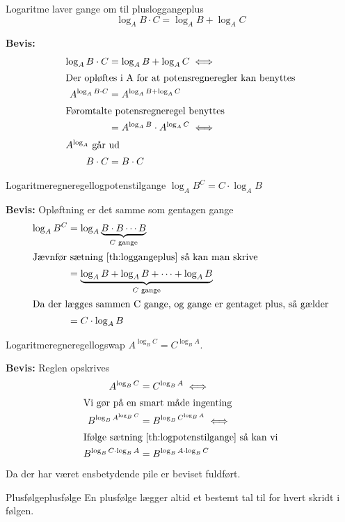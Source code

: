 \documentclass{article}
\begin{document}
\begin{theorem}{Logaritme laver gange om til plus}{loggangeplus}
	\[\log_A{B \cdot C} = \log_AB + \log_AC\]
\end{theorem}
\textbf{Bevis:}
\begin{align*}
	\log_A{B \cdot C} &= \log_AB + \log_AC \iff\\
\intertext{Der opløftes i A for at potensregneregler kan benyttes}
	A^{\log_A{B \cdot C}} &= A^{\log_AB + \log_AC}\\
\intertext{Føromtalte potensregneregel benyttes}
						  &= A^{\log_AB} \cdot A^{\log_AC} \iff\\
\intertext{$A^{\log_A}$ går ud}
	B \cdot C &= B \cdot C
\end{align*}

\begin{theorem}{Logaritmeregneregel}{logpotenstilgange}
	$\log_AB^C = C \cdot \log_AB$
\end{theorem}
\textbf{Bevis:}
Opløftning er det samme som gentagen gange
\begin{align*}
	\log_AB^C &= \log_A{\underbrace{B \cdot B \cdots B}_{C\text{ gange}}}\\
\intertext{Jævnfør sætning \ref{th:loggangeplus} så kan man skrive}
			  &= \underbrace{\log_A{B} + \log_A{B} + \cdots + \log_A{B}}_{C\text{ gange}}\\
\intertext{Da der lægges sammen C gange, og gange er gentaget plus, så gælder}
			  &= C \cdot \log_AB
\end{align*}

\begin{theorem}{Logaritmeregneregel}{logswap}
	$A^{\log_BC} = C^{\log_BA}$.
\end{theorem}
\textbf{Bevis:}
Reglen opskrives
\begin{align*}
	A^{\log_BC} &= C^{\log_BA} \iff\\
\intertext{Vi gør på en smart måde ingenting}
	B^{\log_B{A^{\log_BC}}} &= B^{\log_B{C^{\log_BA}}} \iff\\
\intertext{Ifølge sætning \ref{th:logpotenstilgange} så kan vi}
	B^{\log_BC \cdot \log_B{A}} &= B^{\log_BA \cdot \log_B{C}}
\end{align*}
Da der har været ensbetydende pile er beviset fuldført.

\begin{definition}{Plusfølge}{plusfølge}
	En plusfølge lægger altid et bestemt tal til for hvert skridt i følgen.
\end{definition}
\end{document}
